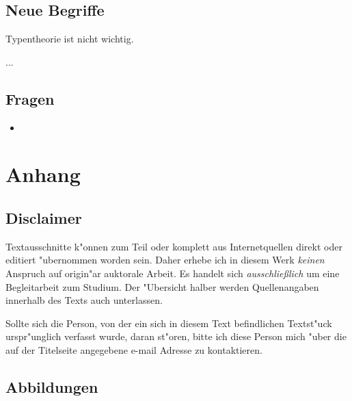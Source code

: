 \documentclass[emulatestandardclasses]{scrartcl}
\begin{document}
\vspace{10pt}
\subsection{Neue Begriffe}

Typentheorie ist nicht wichtig.

\begin{description}[leftmargin=!,labelwidth=\widthof{\bfseries Sachverhalt}]
  \item[Bild] ...
  \item[Tatsache] 
\end{description}

\subsection{Fragen}

\begin{itemize}
  \item 
\end{itemize}


\newpage
\section{Anhang}

\subsection{Disclaimer}

Textausschnitte k"onnen zum Teil oder komplett aus Internetquellen direkt oder editiert "ubernommen worden sein. Daher erhebe ich in diesem Werk \emph{keinen} Anspruch auf origin"ar auktorale Arbeit. Es handelt sich \emph{ausschlie\ss lich} um eine Begleitarbeit zum Studium. Der "Ubersicht halber werden Quellenangaben innerhalb des Texts auch unterlassen. 

Sollte sich die Person, von der ein sich in diesem Text befindlichen Textst"uck urspr"unglich verfasst wurde, daran st"oren, bitte ich diese Person mich "uber die auf der Titelseite angegebene e-mail Adresse zu kontaktieren.
\subsection{Abbildungen}
\end{document}
